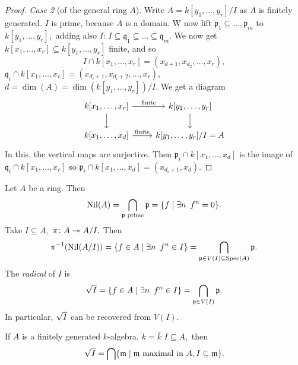 \begin{proof}
  \emph{Case 2} (of the general ring \(A\)).
  Write
  \(A = k[y_1, \dotsc, y_r]/{I}\)
  as \(A\) is finitely generated.
  \(I\) is prime, because \(A\) is a domain.
  W now lift
  \(\mathfrak p_1 \subseteq \dotsc, \mathfrak p_m\)
  to \(k[y_1, \dotsc, y_r],\) adding also \(I\):
  \(I \subseteq \mathfrak q_1 \subseteq \dotso \subseteq \mathfrak q_m.\)
  We now get
  \(k[x_1, \dotsc, x_r] \subseteq k[y_1, \dotsc, y_r]\) finite, and so
  \[I \cap k[x_1, \dotsc, x_r] = (x_{d+1}, x_{d_2}, \dotsc, x_r),\]
  \(\mathfrak q_i \cap k[x_1, \dotsc, x_r] = (x_{d_i+1}, x_{d_i+2}, \dotsc, x_r),\)
  \(d = \dim(A) = \dim(k[y_1, \dotsc, y_r])/{I}.\)
  We get a diagram
  \begin{equation*}
    \begin{tikzcd}
      k[x_1, \dotsc, x_r] \arrow{r}{\text{finite}} \arrow{d}
      & k[y_1, \dotsc, y_r] \arrow{d} \\
      k[x_1, \dotsc, x_d] \arrow{r}{\text{finite}}
      & k[y_1, \dotsc, y_r]/{I} = A
    \end{tikzcd}
  \end{equation*}
  In this, the vertical maps are surjective.
  Then
  \(\mathfrak p_i \cap k[x_1, \dotsc, x_d]\) is the image of \(\mathfrak q_i \cap k[x_1, \dotsc, x_r]\)
  so
  \(\mathfrak p_i \cap k[x_1, \dotsc, x_d] = (x_{d_i+1}, x_{d}).\)
\end{proof}


\begin{note}
  Let \(A\) be a ring. Then
  \[\operatorname{Nil}(A) = \bigcap_{\mathfrak p \text{ prime}} \mathfrak p = \{f \mathrel{|} \exists n \enspace f^n = 0\}.\]
  Take \(I \subseteq A,\) \(\pi \colon A \twoheadrightarrow A/{I}.\)
  Then
  \[\pi^{-1}(\operatorname{Nil}(A/{I})) = \{f \in A \mathrel{|} \exists n \enspace f^n \in I\} = \bigcap_{\mathfrak p \in V(I) \subseteq \text{Spec}(A)} \mathfrak p.\]
  The \emph{radical} of \(I\) is
  \[\sqrt{I} = \{f \in A \mathrel{|} \exists n \enspace f^n \in I\} = \bigcap_{\mathfrak p \in V(I)} \mathfrak p.\]
  In particular, \(\sqrt{I}\) can be recovered from \(V(I).\)
\end{note}

\begin{theorem}[Nullstellensatz]
  \label{Nullstellensatz}
  If \(A\) is a finitely generated \(k\)-algebra, \(k = \bar k\) \(I \subseteq A,\) then
  \[\sqrt{I} = \bigcap \{\mathfrak m \mathrel{|} \mathfrak m \text{ maximal in \(A\)}, I \subseteq \mathfrak{ m}\}.\]
\end{theorem}

